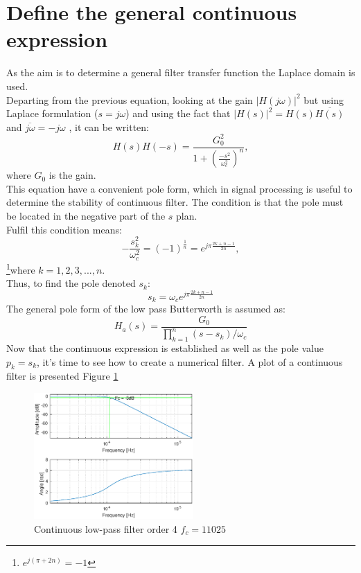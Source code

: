 \documentclass[twoside,twocolumn]{article}
\begin{document}
\section{Define the general continuous expression}
As the aim is to determine a general filter transfer function the Laplace domain is used.\\
Departing from the previous equation, looking at the gain $|H(j\omega)|^2$ but using Laplace formulation ($s=j\omega$) and using the fact that $|H(s)|^2=H(s)\overline{H(s)}$ and $\overline{j\omega}=-j\omega$ , it can be written:
\begin{equation}
H(s)H(-s)=\frac{G_0^2}{1+(\frac{-s^2}{\omega_c^2})^n},
\end{equation}
where $G_0$ is the gain.\\
This equation have a convenient pole form, which in signal processing is useful to determine the stability of continuous filter. The condition is that the pole must be located in the negative part of the $s$ plan. \\
Fulfil this condition means:
\begin{equation}
-\frac{s_k^2}{\omega_c^2}=(-1)^{\frac{1}{n}} = e^{j\pi\frac{2k+n-1}{2n}},
\end{equation}
\footnote{$e^{j(\pi+ 2n)}=-1$}where $k=1,2,3,...,n$.\\
Thus, to find the pole denoted $s_k$:
\begin{equation}
	s_k= \omega_c e^{j\pi\frac{2k+n-1}{2n}}
	\label{eq:polec}
\end{equation}
The general pole form of the low pass Butterworth is assumed as: 
\begin{equation}
	H_a(s)=\frac{G_0}{\prod_{k=1}^{n}(s-s_k)/\omega_c}
	\label{eq:ButterS}
\end{equation}
Now that the continuous expression is established as well as the pole value $p_k=s_k$, it's time to see how to create a numerical filter. A plot of a continuous filter is presented Figure \ref{contfilt}
  \begin{figure}[h!]
  	\centering
  	\includegraphics[width=230px]{./images/Buttcontfcny.eps}
  	\caption{Continuous low-pass filter order 4 $f_{c}=11025$ }
  	\label{contfilt}
  \end{figure}
  
\end{document}
